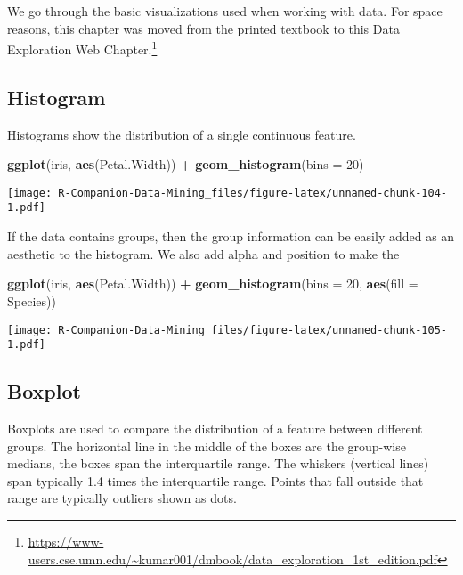 \documentclass[
  notitlepage]{book}
\newenvironment{Shaded}{\begin{snugshade}}{\end{snugshade}}
\newcommand{\DataTypeTok}[1]{\textcolor[rgb]{0.13,0.29,0.53}{#1}}
\newcommand{\DecValTok}[1]{\textcolor[rgb]{0.00,0.00,0.81}{#1}}
\newcommand{\KeywordTok}[1]{\textcolor[rgb]{0.13,0.29,0.53}{\textbf{#1}}}
\newcommand{\NormalTok}[1]{#1}
\newcommand{\OperatorTok}[1]{\textcolor[rgb]{0.81,0.36,0.00}{\textbf{#1}}}
\newcommand{\StringTok}[1]{\textcolor[rgb]{0.31,0.60,0.02}{#1}}
\DeclareRobustCommand{\href}[2]{#2\footnote{\url{#1}}}
\begin{document}
We go through the basic visualizations used when working with data.
For space reasons, this chapter was moved from the
printed textbook to this
\href{https://www-users.cse.umn.edu/~kumar001/dmbook/data_exploration_1st_edition.pdf}{Data Exploration Web Chapter.}

\hypertarget{histogram}{%
\subsection{Histogram}\label{histogram}}

Histograms show the distribution of a single continuous feature.

\begin{Shaded}
\begin{Highlighting}[]
\KeywordTok{ggplot}\NormalTok{(iris, }\KeywordTok{aes}\NormalTok{(Petal.Width)) }\OperatorTok{+}\StringTok{ }\KeywordTok{geom\_histogram}\NormalTok{(}\DataTypeTok{bins =} \DecValTok{20}\NormalTok{)}
\end{Highlighting}
\end{Shaded}

\texttt{[image: R-Companion-Data-Mining\_files/figure-latex/unnamed-chunk-104-1.pdf]}

If the data contains groups, then the group information can be easily
added as an aesthetic to the histogram. We also add alpha and position
to make the

\begin{Shaded}
\begin{Highlighting}[]
\KeywordTok{ggplot}\NormalTok{(iris, }\KeywordTok{aes}\NormalTok{(Petal.Width)) }\OperatorTok{+}\StringTok{ }
\StringTok{         }\KeywordTok{geom\_histogram}\NormalTok{(}\DataTypeTok{bins =} \DecValTok{20}\NormalTok{, }\KeywordTok{aes}\NormalTok{(}\DataTypeTok{fill =}\NormalTok{ Species))}
\end{Highlighting}
\end{Shaded}

\texttt{[image: R-Companion-Data-Mining\_files/figure-latex/unnamed-chunk-105-1.pdf]}

\hypertarget{boxplot}{%
\subsection{Boxplot}\label{boxplot}}

Boxplots are used to compare the distribution of a feature between
different groups. The horizontal line in the middle of the boxes are the
group-wise medians, the boxes span the interquartile range. The whiskers
(vertical lines) span typically 1.4 times the interquartile range.
Points that fall outside that range are typically outliers shown as
dots.
\end{document}
